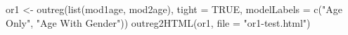 \begin{Schunk}
\begin{Sinput}
 or1 <- outreg(list(mod1age, mod2age), tight = TRUE, modelLabels = c("Age Only", "Age With Gender"))
 outreg2HTML(or1, file = "or1-test.html")
\end{Sinput}
\end{Schunk}
